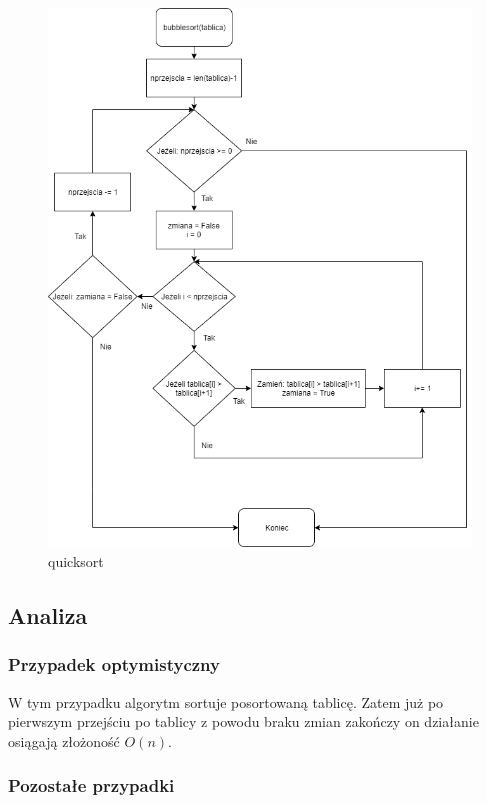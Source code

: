 \documentclass[11pt]{article}
\begin{document}
\begin{figure}
\centering
\includegraphics{Bubblesort/Bubble.png}
\caption{quicksort}
\end{figure}

\hypertarget{analiza-matematyczna}{%
\subsection{Analiza}\label{analiza-matematyczna}}

\hypertarget{przypadek-optymistyczny}{%
\subsubsection{Przypadek optymistyczny}\label{przypadek-optymistyczny}}

W tym przypadku algorytm sortuje posortowaną tablicę. Zatem już po
pierwszym przejściu po tablicy z powodu braku zmian zakończy on
działanie osiągają złożoność \(O(n)\).

\hypertarget{pozostaux142e-przypadki}{%
\subsubsection{Pozostałe przypadki}\label{pozostaux142e-przypadki}}
\end{document}
